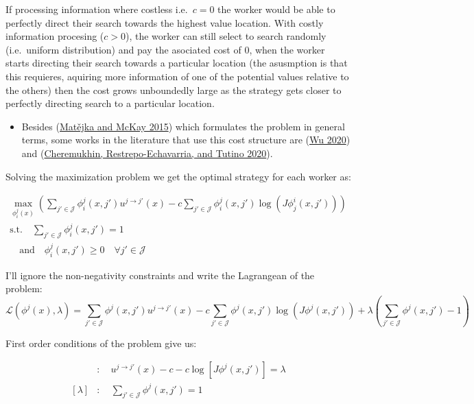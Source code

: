 \documentclass[
  letterpaper,
  DIV=11,
  numbers=noendperiod]{scrreprt}
\providecommand{\tightlist}{%
  \setlength{\itemsep}{0pt}\setlength{\parskip}{0pt}}\usepackage{longtable,booktabs,array}
\begin{document}
If processing information where costless i.e.~\(c = 0\) the worker would
be able to perfectly direct their search towards the highest value
location. With costly information procesing (\(c > 0\)), the worker can
still select to search randomly (i.e.~uniform distribution) and pay the
asociated cost of \(0\), when the worker starts directing their search
towards a particular location (the asusmption is that this requieres,
aquiring more information of one of the potential values relative to the
others) then the cost grows unboundedly large as the strategy gets
closer to perfectly directing search to a particular location.

\begin{itemize}
\tightlist
\item
  Besides
  (\protect\hyperlink{ref-matejkaRationalInattentionDiscrete2015}{Matějka
  and McKay 2015}) which formulates the problem in general terms, some
  works in the literature that use this cost structure are
  (\protect\hyperlink{ref-wuPartiallyDirectedSearch2020}{Wu 2020}) and
  (\protect\hyperlink{ref-cheremukhinTargetedSearchMatching2020}{Cheremukhin,
  Restrepo-Echavarria, and Tutino 2020}).
\end{itemize}

Solving the maximization problem we get the optimal strategy for each
worker as:

\begin{align*}
\max_{\phi_i^j(x)} \left( \sum_{j' \in \mathcal{J}} \phi_i^j(x, j') u^{j\to j'}(x) - c \sum_{j'\in \mathcal{J}}\phi^j_i(x, j')\log{(J\phi^i_j(x, j'))} \right) \\
\text{s.t.} \quad \sum_{j'\in \mathcal{J}}\phi^j_i(x, j') = 1 \\
\quad \text{and} \quad \phi^j_i(x, j') \geq 0 \quad \forall j' \in \mathcal{J}
\end{align*}

I'll ignore the non-negativity constraints and write the Lagrangean of
the problem:
\[\mathcal{L}(\phi^j(x), \lambda) =  \sum_{j'\in\mathcal{J}} \phi^j(x, j') u^{j\to j'}(x) - c \sum_{j'\in \mathcal{J}}\phi^j(x, j')\log{(J\phi^j(x, j'))} + \lambda \left(\sum_{j'\in \mathcal{J}}\phi^j(x, j') - 1\right)\]

First order conditions of the problem give us:

\begin{align*}
  [\phi^j(x, j')] &:\quad u^{j\to j'}(x) - c - c \log[J \phi^j(x, j')] = \lambda \\
  [\lambda] &: \quad \sum_{j'\in \mathcal{J}}\phi^j(x, j') = 1
\end{align*}
\end{document}
